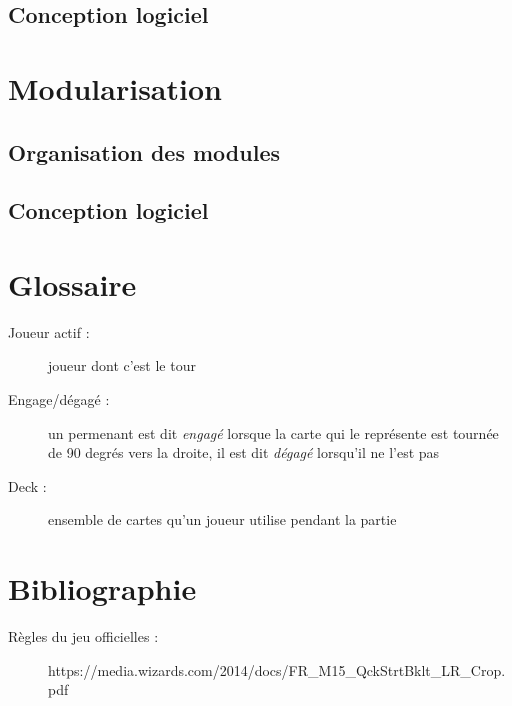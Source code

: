 \documentclass[a4paper,12pt]{article}
\begin{document}
\clearpage
\subsection{Conception logiciel}




\section{Modularisation}
\label{sec:module}

\subsection{Organisation des modules}

\clearpage
\subsection{Conception logiciel}


%

\section{Glossaire}

\begin{description}
\item[Joueur actif :] joueur dont c'est le tour
\item[Engage/dégagé :] un permenant est dit \emph{engagé} lorsque la carte qui le représente est tournée de 90 degrés vers la droite, il est dit \emph{dégagé} lorsqu'il ne l'est pas
\item[Deck :] ensemble de cartes qu'un joueur utilise pendant la partie
\end{description}


\section{Bibliographie}

\begin{description}
\item[Règles du jeu officielles :] https://media.wizards.com/2014/docs/FR\_M15\_QckStrtBklt\_LR\_Crop.pdf

\end{description}
\end{document}
